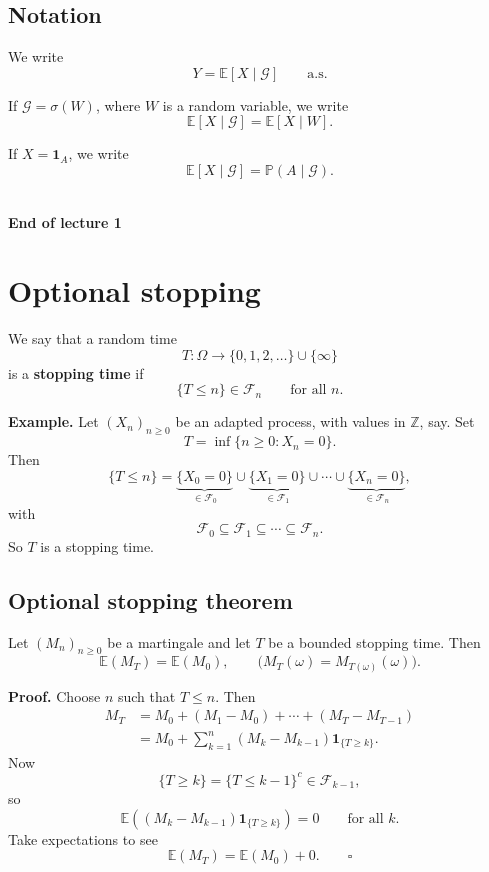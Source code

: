 \documentclass[11pt,a4paper]{article}
\begin{document}
\subsection{Notation}

We write
\[
Y=\mathbb{E}[X\mid\mathcal{G}]
\qquad\text{a.s.}
\]

If $\mathcal{G}=\sigma(W)$, where $W$ is a random variable,
we write
\[
\mathbb{E}[X\mid\mathcal{G}]
=
\mathbb{E}[X\mid W].
\]

If $X=\mathbf{1}_A$, we write
\[
\mathbb{E}[X\mid\mathcal{G}]
=
\mathbb{P}(A\mid\mathcal{G}).
\]
\\

\begin{center}
    \textbf{End of lecture 1}
\end{center}

\section*{Optional stopping}

We say that a random time
\[
T:\Omega\longrightarrow \{0,1,2,\ldots\}\cup\{\infty\}
\]
is a \textbf{stopping time} if
\[
\{T\leq n\}\in\mathcal{F}_n
\qquad\text{for all }n.
\]

\noindent\textbf{Example.}
Let $(X_n)_{n\geq 0}$ be an adapted process, with values in $\mathbb{Z}$, say.
Set
\[
T=\inf\{n\geq 0:X_n=0\}.
\]
Then
\[
\{T\leq n\}
=
\underbrace{\{X_0=0\}}_{\in\mathcal{F}_0}
\cup
\underbrace{\{X_1=0\}}_{\in\mathcal{F}_1}
\cup\cdots\cup
\underbrace{\{X_n=0\}}_{\in\mathcal{F}_n},
\]
with
\[
\mathcal{F}_0\subseteq\mathcal{F}_1
\subseteq\cdots\subseteq\mathcal{F}_n.
\]
So $T$ is a stopping time.

\subsection*{Optional stopping theorem}

Let $(M_n)_{n\geq 0}$ be a martingale and let $T$ be a bounded stopping time.
Then
\[
\mathbb{E}(M_T)=\mathbb{E}(M_0),
\qquad
\bigl(M_T(\omega)=M_{T(\omega)}(\omega)\bigr).
\]

\noindent\textbf{Proof.}
Choose $n$ such that $T\leq n$. Then
\[
\begin{aligned}
M_T
&=M_0+(M_1-M_0)+\cdots+(M_T-M_{T-1})\\
&=M_0+\sum_{k=1}^{n}(M_k-M_{k-1})
  \mathbf{1}_{\{T\geq k\}}.
\end{aligned}
\]
Now
\[
\{T\geq k\}
=
\{T\leq k-1\}^{c}
\in\mathcal{F}_{k-1},
\]
so
\[
\mathbb{E}\!\left(
(M_k-M_{k-1})\mathbf{1}_{\{T\geq k\}}
\right)=0
\qquad\text{for all }k.
\]
Take expectations to see
\[
\mathbb{E}(M_T)=\mathbb{E}(M_0)+0.
\qquad\square
\]
\end{document}
